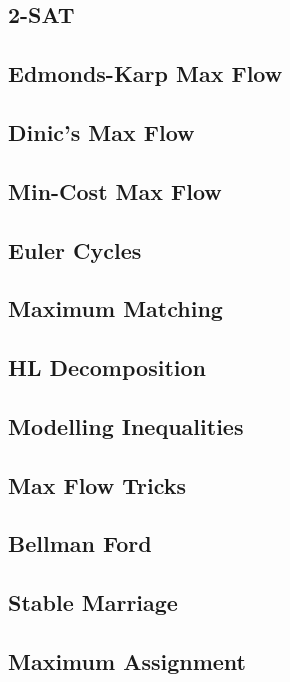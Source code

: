 		\subsection{2-SAT}
			
		\subsection{Edmonds-Karp Max Flow}
			
		\subsection{Dinic's Max Flow}
			
		\subsection{Min-Cost Max Flow}
			
		\subsection{Euler Cycles}
			
		\subsection{Maximum Matching}
			
		\subsection{HL Decomposition}
			
		\subsection{Modelling Inequalities}
			
		\subsection{Max Flow Tricks}
			
		\subsection{Bellman Ford}
			
		\subsection{Stable Marriage}
			
		\subsection{Maximum Assignment}
			
